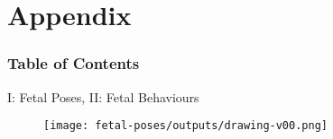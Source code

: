 \section{Appendix}

\begin{frame}
  \frametitle{Table of Contents}
  \tableofcontents[currentsection]
\end{frame}



{
\begin{frame}{I: Fetal Poses, II: Fetal Behaviours}
      \begin{figure}
        \centering
        \texttt{[image: fetal-poses/outputs/drawing-v00.png]}
      \end{figure}
\end{frame}
}



